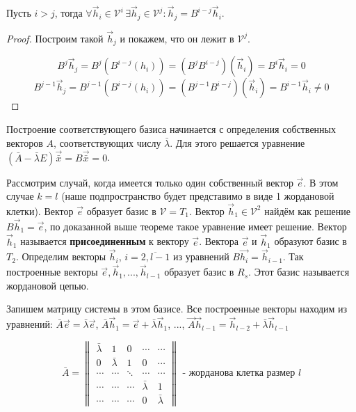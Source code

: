 \begin{theorem}
  Пусть $i > j$, тогда $\forall \vec{h}_i \in \mathcal{V}^i \, \exists \vec{h}_j \in \mathcal{V}^j: \vec{h}_j = B^{i-j}\vec{h}_i$.
\end{theorem}

\begin{proof}
  Построим такой $\vec{h}_j$ и покажем, что он лежит в $\mathcal{V}^j$.

  \[ B^j \vec{h}_j = B^j (B^{i-j}(h_i)) = (B^j B^{i-j} )(\vec{h}_i) = B^i \vec{h}_i = 0 \] 
  \[ B^{j-1} \vec{h}_j = B^{j-1} (B^{i-j}(h_i)) = (B^{j-1} B^{i-j} )(\vec{h}_i) = B^{i-1} \vec{h}_i \neq 0 \]
\end{proof}

Построение соответствующего базиса начинается с определения собственных векторов $A$, соответствующих числу $\bar{\lambda}$.
Для этого решается уравнение $(\bar{A} - \bar{\lambda} E) \vec{\bar{x}} = B  \vec{\bar{x}} = 0$.

Рассмотрим случай, когда имеется только один собственный вектор $\vec{e}$. В этом случае $k = l$ (наше подпространство будет представимо в виде 1 жордановой клетки). 
Вектор $\vec{e}$ образует базис в $\mathcal{V} = T_1$. Вектор $\vec{h}_1 \in \mathcal{V}^2$ найдём как решение $B \vec{h}_1 = \vec{e}$, по доказанной выше теореме такое уравнение имеет решение. 
Вектор $\vec{h}_1$ называется \textbf{присоединенным} к вектору $\vec{e}$. Вектора $\vec{e}$ и $\vec{h}_1$ образуют базис в $T_2$. 
Определим векторы $\vec{h}_i$, $i = \overline{2, l-1}$ из уравнений $B \vec{h_i} = \vec{h}_{i-1}$. Так построенные векторы $\vec{e}, \vec{h}_1, ..., \vec{h}_{l-1}$ образует базис в $R_s$. 
Этот базис называется жордановой цепью.

Запишем матрицу системы в этом базисе. Все построенные векторы находим из уравнений: 
$\bar{A}\vec{e} = \bar{\lambda} \vec{e}$, $\bar{A} \vec{h}_1 = \vec{e} + \bar{\lambda} \vec{h}_1$, ..., $\vec{A} \vec{h}_{l-1} = \vec{h}_{l-2} + \bar{\lambda} \vec{h}_{l-1}$

\[ \bar{A} = \begin{Vmatrix*} \bar{\lambda} & 1 & 0 & \cdots & \cdots \\
                              0 & \bar{\lambda} & 1 & 0 & \cdots     \\
                              \cdots & \cdots & \ddots & \cdots & \cdots \\
                              \cdots & \cdots & \cdots & \bar{\lambda} & 1 \\ 
                              \cdots & \cdots & \cdots & 0 & \bar{\lambda} 
             \end{Vmatrix*} \text{ - жорданова клетка размер $l$}
             \]

